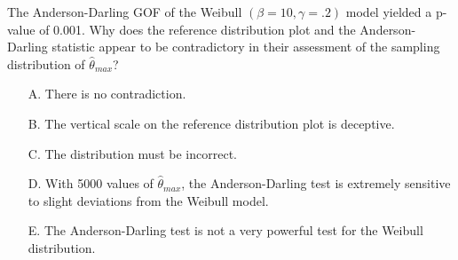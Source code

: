 \documentclass{article}\usepackage{graphicx, color}
\def\be{\begin{enumerate}}
\def\ee{\end{enumerate}}
\def\vn{\vskip0mm}
\def\vnn{\vskip0mm\noindent}
\begin{document}
\begin{enumerate}
\vn
The Anderson-Darling GOF of the Weibull $(\beta=10,\gamma=.2)$ model yielded a p-value of 0.001.
Why does the reference distribution plot and the Anderson-Darling statistic appear to be contradictory in their assessment of
the sampling distribution of $\hat\theta_{max}$?
\be
\item[A.] There is no contradiction.
\item[B.] The vertical scale on the reference distribution plot is deceptive.
\item[C.] The distribution must be incorrect.
\item[D.] With 5000 values of $\hat\theta_{max}$, the Anderson-Darling test is extremely sensitive to slight deviations
from the Weibull model.
\item[E.] The Anderson-Darling test is not a very powerful test for the Weibull distribution.
\ee
\ee
\vnn\vnn
\vfill
\end{document}
